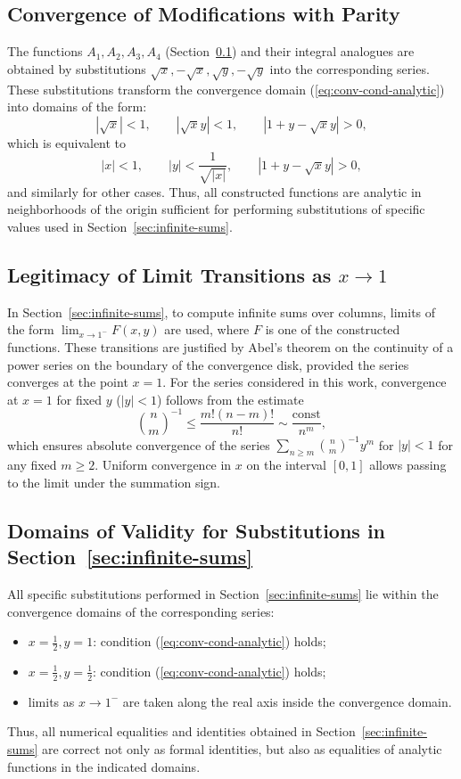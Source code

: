 \documentclass[12pt]{article}
\begin{document}
\subsection{Convergence of Modifications with Parity}\label{sec:parity-mods}

The functions $A_1, A_2, A_3, A_4$ (Section~\ref{sec:parity-mods}) and their integral
analogues are obtained by substitutions $\sqrt{x}, -\sqrt{x}, \sqrt{y}, -\sqrt{y}$
into the corresponding series. These substitutions transform the convergence domain
(\ref{eq:conv-cond-analytic}) into domains of the form:
\[
|\sqrt{x}|<1, \qquad |\sqrt{x}y|<1, \qquad |1+y-\sqrt{x}y|>0,
\]
which is equivalent to
\[
|x|<1, \qquad |y|<\frac{1}{\sqrt{|x|}}, \qquad |1+y-\sqrt{x}y|>0,
\]
and similarly for other cases. Thus, all constructed functions
are analytic in neighborhoods of the origin sufficient for performing
substitutions of specific values used in Section~\ref{sec:infinite-sums}.

\subsection{Legitimacy of Limit Transitions as $x\to 1$}\label{subsec:limit-justification}

In Section~\ref{sec:infinite-sums}, to compute infinite sums over columns,
limits of the form $\lim_{x\to 1^-} F(x,y)$ are used, where $F$ is one of the constructed
functions. These transitions are justified by Abel's theorem on the continuity of a power series
on the boundary of the convergence disk, provided the series converges at the point $x=1$.
For the series considered in this work, convergence at $x=1$ for fixed
$y$ ($|y|<1$) follows from the estimate
\[
\binom{n}{m}^{-1} \leq \frac{m!(n-m)!}{n!} \sim \frac{\text{const}}{n^m},
\]
which ensures absolute convergence of the series $\sum_{n\geq m} \binom{n}{m}^{-1} y^m$
for $|y|<1$ for any fixed $m\geq 2$. Uniform convergence in $x$
on the interval $[0,1]$ allows passing to the limit under the summation sign.

\subsection{Domains of Validity for Substitutions in Section~\ref{sec:infinite-sums}}

All specific substitutions performed in Section~\ref{sec:infinite-sums}
lie within the convergence domains of the corresponding series:
\begin{itemize}
\item $x=\tfrac12, y=1$: condition (\ref{eq:conv-cond-analytic}) holds;
\item $x=\tfrac12, y=\tfrac12$: condition (\ref{eq:conv-cond-analytic}) holds;
\item limits as $x\to 1^-$ are taken along the real axis inside the convergence domain.
\end{itemize}
Thus, all numerical equalities and identities obtained in Section~\ref{sec:infinite-sums}
are correct not only as formal identities, but also as equalities
of analytic functions in the indicated domains.
\end{document}

